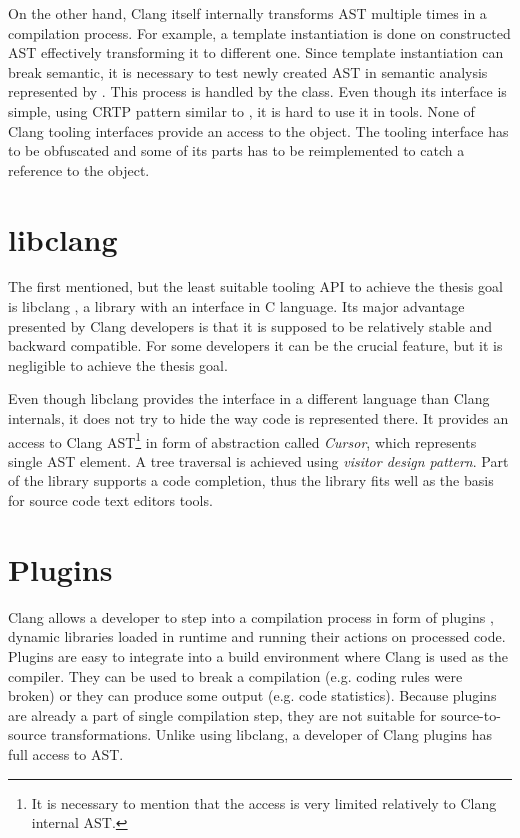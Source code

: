 On the other hand, Clang itself internally transforms AST multiple times in a compilation process. For example, a template instantiation is done on constructed AST effectively transforming it to different one. Since template instantiation can break semantic, it is necessary to test newly created AST in semantic analysis represented by . This process is handled by the  class. Even though its interface is simple, using CRTP pattern similar to , it is hard to use it in tools. None of Clang tooling interfaces provide an access to the  object. The tooling interface has to be obfuscated and some of its parts has to be reimplemented to catch a reference to the object.

\section{libclang}
The first mentioned, but the least suitable tooling API to achieve the thesis goal is libclang \cite{clang-libclang}, a library with an interface in C language. Its major advantage presented by Clang developers is that it is supposed to be relatively stable and backward compatible. For some developers it can be the crucial feature, but it is negligible to achieve the thesis goal.

Even though libclang provides the interface in a different language than Clang internals, it does not try to hide the way code is represented there. It provides an access to Clang AST\footnote{It is necessary to mention that the access is very limited relatively to Clang internal AST.} in form of abstraction called \emph{Cursor}, which represents single AST element. A tree traversal is achieved using \emph{visitor design pattern}. Part of the library supports a code completion, thus the library fits well as the basis for source code text editors tools.

\section{Plugins}
Clang allows a developer to step into a compilation process in form of plugins \cite{clang-plugins}, dynamic libraries loaded in runtime and running their actions on processed code. Plugins are easy to integrate into a build environment where Clang is used as the compiler. They can be used to break a compilation (e.g. coding rules were broken) or they can produce some output (e.g. code statistics). Because plugins are already a part of single compilation step, they are not suitable for source-to-source transformations. Unlike using libclang, a developer of Clang plugins has full access to AST.


